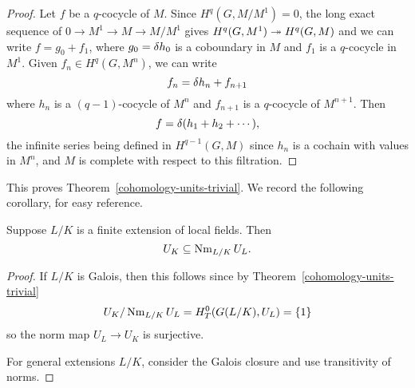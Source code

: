 \begin{proof}
Let $f$ be a $q$-cocycle of $M$. 
Since $H^q(G,M/M^1)=0$, the long exact sequence of $0\to M^1\to M\to M/M^1$ gives $H^q(G,M^1)\twoheadrightarrow H^q(G,M)$ and we can write $f=g_0+f_1$, where $g_0=\delta h_0$ is a coboundary in $M$ and $f_1$ is a $q$-cocycle in $M^1$. Given $f_n\in H^q(G,M^n)$, we can write
\[
f_n=\delta h_{n}+f_{n+1}
\] 
where $h_{n}$ is a $(q-1)$-cocycle of $M^n$ and $f_{n+1}$ is a $q$-cocycle of $M^{n+1}$. Then
\[
f=\delta(h_1+h_2+\cdots ),
\]
the infinite series being defined in $H^{q-1}(G,M)$ since $h_n$ is a cochain with values in $M^n$, and $M$ is complete with respect to this filtration.
\end{proof}
This proves Theorem~\ref{cohomology-units-trivial}. We record the following corollary, for easy reference.
\begin{cor}
Suppose $L/K$ is a finite extension of local fields. Then
\[
U_K\subseteq \operatorname{Nm}_{L/K}U_L.
\]
\end{cor}
\begin{proof}
If $L/K$ is Galois, then this follows since by Theorem~\ref{cohomology-units-trivial}
\[
U_K/\operatorname{Nm}_{L/K}U_L=H_T^0(G(L/K),U_L)=\{1\}
\]
so the norm map $U_L\to U_K$ is surjective.

For general extensions $L/K$, consider the Galois closure and use transitivity of norms.
\end{proof}

